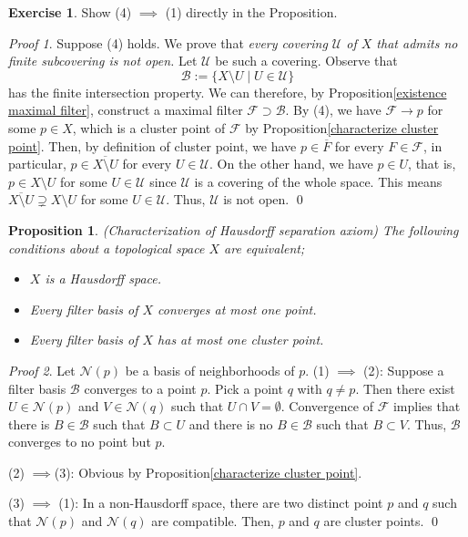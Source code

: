 \documentclass[a4paper,12pt]{article}
\newtheorem{prp}[thm]{Proposition}
\theoremstyle{remark}
\newtheorem*{prf}{Proof}
\theoremstyle{definition}
\theoremstyle{definition}
\theoremstyle{definition}
\newtheorem{exe}[thm]{Exercise}
\begin{document}
\begin{exe}
	Show (4) \( \implies \) (1) directly in the Proposition.
\end{exe}
\begin{prf}
	Suppose (4) holds. We prove that \textit{every covering \( \mathscr{U} \) of \( X \) that admits no finite subcovering is not open.}
	Let \( \mathscr{U} \) be such a covering. Observe that
	\begin{equation*}
		\mathscr{B}:=\{X \setminus U \mid U \in \mathscr{U}\}
	\end{equation*}
	has the finite intersection property. We can therefore, by Proposition\ref{existence maximal filter}, construct a maximal filter \( \mathscr{F} \supset \mathscr{B} \). By (4), we have \( \mathscr{F}\to p \) for some \( p \in X \), which is a cluster point of \( \mathscr{F} \) by Proposition\ref{characterize cluster point}. Then, by definition of cluster point, we have \( p \in \overline{F} \) for every \( F \in \mathscr{F} \), in particular, \( p \in \overline{X \setminus U} \) for every \( U \in \mathscr{U} \).
	On the other hand, we have \( p \in U \), that is, \( p \in X \setminus U \) for some \( U \in \mathscr{U} \) since \( \mathscr{U} \) is a covering of the whole space. This means \( \overline{X \setminus U} \supsetneq X \setminus U \) for some \( U \in \mathscr{U} \). Thus, \( \mathscr{U} \) is not open.
	\qed\end{prf}

\begin{prp}\label{characterize Hausdorff} (Characterization of Hausdorff separation axiom)
	The following conditions about a topological space \( X \) are equivalent;
	\begin{itemize}
		\item[(1)] \( X \) is a Hausdorff space.
		\item[(2)] Every filter basis of \( X \) converges at most one point.
		\item[(3)] Every filter basis of \( X \) has at most one cluster point.
	\end{itemize}
\end{prp}
\begin{prf}
	Let \( \mathscr{N}(p) \) be a basis of neighborhoods of \( p \).
	(1) \( \implies  \) (2):
	Suppose a filter basis \( \mathscr{B} \) converges to a point \( p \). Pick a point \( q \) with \( q \neq p \). Then there exist \( U \in \mathscr{N}(p) \) and \( V \in \mathscr{N}(q)\) such that \( U \cap V = \emptyset \). Convergence of \( \mathscr{F} \) implies that there is \( B \in \mathscr{B} \) such that \( B \subset U \) and there is no \( B \in \mathscr{B}\) such that \( B \subset V \). Thus, \( \mathscr{B} \) converges to no point but \( p \).

	(2) \( \implies \)(3): Obvious by Proposition\ref{characterize cluster point}.

	(3) \( \implies \) (1):
	In a non-Hausdorff space, there are two distinct point \( p \) and \( q \) such that \( \mathscr{N}(p) \) and \( \mathscr{N}(q) \) are compatible. Then, \( p \) and \( q \) are cluster points.
	\qed\end{prf}
\end{document}
